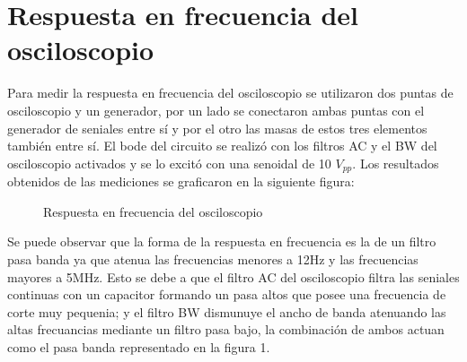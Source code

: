 \section{Respuesta en frecuencia del osciloscopio}

Para medir la respuesta en frecuencia del osciloscopio se utilizaron
dos puntas de osciloscopio y un generador, por un lado se conectaron
ambas puntas con el generador de seniales entre sí y por el otro las
masas de estos tres elementos también entre sí. El bode del circuito
se realizó con los filtros AC y el BW del osciloscopio activados y
se lo excitó con una senoidal de 10 $V_{pp}$. Los resultados obtenidos
de las mediciones se graficaron en la siguiente figura:
\begin{figure}[H]
\caption{Respuesta en frecuencia del osciloscopio}
\end{figure}

Se puede observar que la forma de la respuesta en frecuencia es la
de un filtro pasa banda ya que atenua las frecuencias menores a 12Hz
y las frecuencias mayores a 5MHz. Esto se debe a que el filtro AC
del osciloscopio filtra las seniales continuas con un capacitor formando
un pasa altos que posee una frecuencia de corte muy pequenia; y el
filtro BW dismunuye el ancho de banda atenuando las altas frecuancias
mediante un filtro pasa bajo, la combinación de ambos actuan como
el pasa banda representado en la figura 1.

